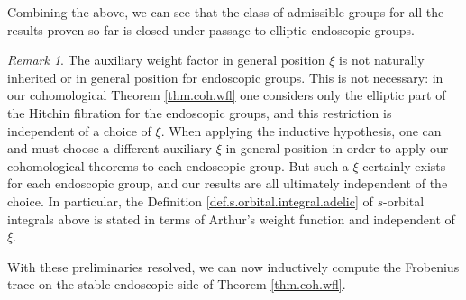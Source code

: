\documentclass[openany]{amsbook}
\theoremstyle{definition}
\theoremstyle{remark}
\newtheorem{remark}[theorem]{Remark}
\numberwithin{equation}{section}
\renewcommand{\-}{\operatorname{-}}
\begin{document}
Combining the above, we can see that the class of admissible groups for all the results proven so far is closed under passage to elliptic endoscopic groups.

\begin{remark}
    The auxiliary weight factor in general position $\xi$ is not naturally inherited or in general position for endoscopic groups. This is not necessary: in our cohomological Theorem \ref{thm.coh.wfl} one considers only the elliptic part of the Hitchin fibration for the endoscopic groups, and this restriction is independent of a choice of $\xi$. When applying the inductive hypothesis, one can and must choose a different auxiliary $\xi$ in general position in order to apply our cohomological theorems to each endoscopic group. But such a $\xi$ certainly exists for each endoscopic group, and our results are all ultimately independent of the choice. In particular, the Definition \ref{def.s.orbital.integral.adelic} of $s$-orbital integrals above is stated in terms of Arthur's weight function and independent of $\xi$.
\end{remark}




With these preliminaries resolved, we can now inductively compute the Frobenius trace on the stable endoscopic side of Theorem \ref{thm.coh.wfl}.
\end{document}

